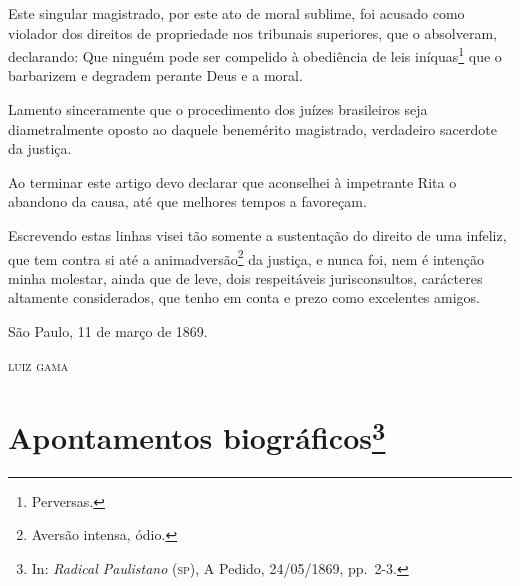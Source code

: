 Este singular magistrado, por este ato de moral sublime, foi acusado
como violador dos direitos de propriedade nos tribunais superiores, que
o absolveram, declarando: Que ninguém pode ser compelido à obediência de
leis iníquas\footnote{Perversas.} que o barbarizem e degradem perante
Deus e a moral.

Lamento sinceramente que o procedimento dos juízes brasileiros seja
diametralmente oposto ao daquele benemérito magistrado, verdadeiro
sacerdote da justiça.

Ao terminar este artigo devo declarar que aconselhei à impetrante Rita o
abandono da causa, até que melhores tempos a favoreçam.

Escrevendo estas linhas visei tão somente a sustentação do direito de
uma infeliz, que tem contra si até a animadversão\footnote{Aversão
  intensa, ódio.} da justiça, e nunca foi, nem é intenção minha
molestar, ainda que de leve, dois respeitáveis jurisconsultos,
carácteres altamente considerados, que tenho em conta e prezo como
excelentes amigos.
\begin{flushright}
São Paulo, 11 de março de 1869.

\textsc{luiz gama}
\end{flushright}
\chapter{Apontamentos biográficos\footnote{In: \emph{Radical Paulistano}
  (\textsc{sp}), A Pedido, 24/05/1869, pp.~2-3.}}

